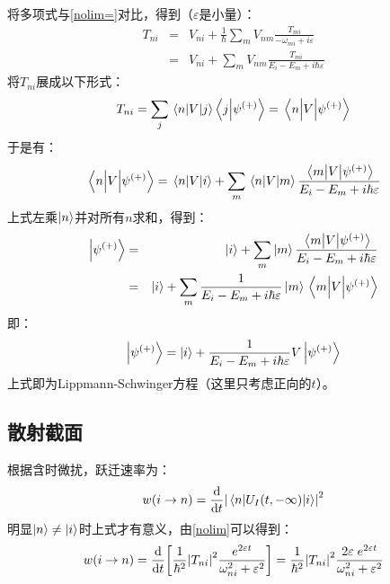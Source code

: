 \documentclass[hyperref]{ctexart}
\begin{document}
将多项式与\eqref{nolim=}对比，得到（$\varepsilon$是小量）：
\begin{eqnarray}
  T_{ni} &=& V_{ni}+\frac{1}{\hbar}\sum_{m}V_{nm}\frac{T_{mi}}{-\omega_{mi}+i\varepsilon} \\
   &=& V_{ni}+\sum_{m}V_{nm}\frac{T_{mi}}{E_i-E_m+i\hbar\varepsilon}
\end{eqnarray}
将$T_{ni}$展成以下形式：
\begin{equation}\label{Tni1}
  T_{ni}=\sum_j\mel{n}{V}{j}\braket{j}{\psi^{(+)}}=\mel{n}{V}{\psi^{(+)}}
\end{equation}
于是有：
\begin{equation}\label{}
  \mel{n}{V}{\psi^{(+)}}=\mel{n}{V}{i}+\sum_{m}\mel{n}{V}{m}\frac{\mel{m}{V}{\psi^{(+)}}}{E_i-E_m+i\hbar\varepsilon}
\end{equation}
上式左乘$\ket{n}$并对所有$n$求和，得到：
\begin{eqnarray}\label{}
  \ket{\psi^{(+)}}&=&\ket{i}+\sum_{m}\ket{m}\frac{\mel{m}{V}{\psi^{(+)}}}{E_i-E_m+i\hbar\varepsilon}\\
  &=&\ket{i}+\sum_{m}\frac{1}{E_i-E_m+i\hbar\varepsilon}\ket{m}\mel{m}{V}{\psi^{(+)}}
\end{eqnarray}
即：
\begin{equation}\label{Lip}
  \ket{\psi^{(+)}}=\ket{i}+\frac{1}{E_i-E_m+i\hbar\varepsilon}{V}\ket{\psi^{(+)}}
\end{equation}
上式即为Lippmann-Schwinger方程（这里只考虑正向的$t$）。
\subsection{散射截面}
根据含时微扰，跃迁速率为：
\begin{equation}\label{w}
  w(i\rightarrow n)=\dv{t}\abs{\mel{n}{U_I(t,-\infty)}{i}}^2
\end{equation}
明显$\ket{n}\neq\ket{i}$时上式才有意义，由\eqref{nolim}可以得到：
\begin{equation}\label{w1}
  w(i\rightarrow n)=\dv{t}\bqty{\frac{1}{\hbar^2}\abs{T_{ni}}^2\frac{e^{2\varepsilon t}}{\omega_{ni}^2+\varepsilon^2}}=\frac{1}{\hbar^2}\abs{T_{ni}}^2\frac{2\varepsilon\; e^{2\varepsilon t}}{\omega_{ni}^2+\varepsilon^2}
\end{equation}
\end{document}
